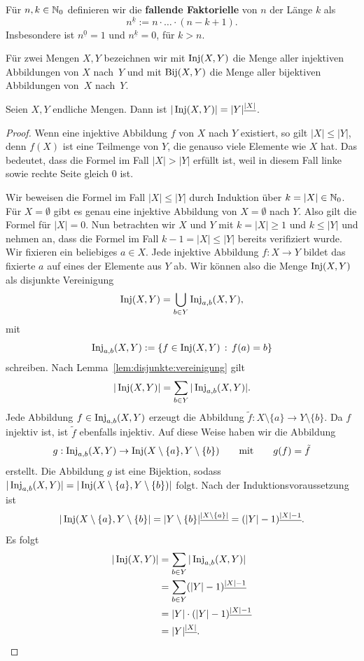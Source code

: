 \begin{defn}
	Für $n, k \in \mathbb{N}_0$ definieren wir die \textbf{fallende Faktorielle} von $n$ der Länge $k$ als
	\[
		n^{\underline{k}} := n \cdot \ldots \cdot (n-k+1).
	\]
	Insbesondere ist $n^{\underline{0}}=1$ und $n^{\underline{k}}=0$, für $k > n$.
\end{defn} 

\begin{defn}
	Für zwei Mengen $X, Y$ bezeichnen wir mit $\operatorname{Inj}(X,Y)$ die Menge aller injektiven Abbildungen von $X$ nach~$Y$ und mit $\operatorname{Bij}(X,Y)$ die Menge aller bijektiven Abbildungen von~$X$ nach~$Y$. 
\end{defn} 

\begin{thm} \label{thm:inj:abbildungen}
	Seien $X,Y$ endliche Mengen. Dann ist $|\operatorname{Inj}(X,Y) | = |Y|^{\underline{|X|}}$. 
\end{thm} 
\begin{proof} 
	Wenn eine injektive Abbildung $f$ von $X$ nach $Y$ existiert, so gilt $|X| \le |Y|$, denn $f(X)$ ist eine Teilmenge von $Y$, die genauso viele Elemente wie $X$ hat. Das bedeutet, dass die Formel im Fall $|X| > |Y|$ erfüllt ist, weil in diesem Fall linke sowie rechte Seite gleich $0$ ist.
	
	Wir beweisen die Formel im Fall $|X| \le |Y|$ durch Induktion über $k = |X| \in \mathbb{N}_0$. Für $X = \emptyset$ gibt es genau eine injektive Abbildung von $X= \emptyset$ nach $Y$. Also gilt die Formel für $|X|=0$. 
	Nun betrachten wir $X$ und $Y$ mit $k=|X| \geq 1$ und $k \le |Y|$ und nehmen an, dass die Formel im Fall $k-1=|X| \le |Y|$ bereits verifiziert wurde. Wir fixieren ein beliebiges $a \in X$. Jede injektive Abbildung $f : X \to Y$ bildet das fixierte $a$ auf eines der Elemente aus $Y$ ab. Wir können also die Menge $\operatorname{Inj}(X,Y)$ als disjunkte Vereinigung 
	\[
			\operatorname{Inj}(X,Y) = \bigcup_{b \in Y} \operatorname{Inj}_{a,b}(X,Y),
	\]
	mit 
	\[
		\operatorname{Inj}_{a,b} (X,Y) := \left\{  f \in \operatorname{Inj}(X,Y) \,:\, f(a) = b \right\}
	\]
	schreiben. Nach Lemma~\ref{lem:disjunkte:vereinigung} gilt 
	\[
			|\operatorname{Inj}(X,Y)| = \sum_{b \in Y} |\operatorname{Inj}_{a,b}(X,Y)|.
	\]
	Jede Abbildung $f  \in \operatorname{Inj}_{a,b}(X,Y)$ erzeugt die Abbildung $\tilde{f} : X \setminus \{a\} \to Y \setminus \{b\}$. Da $f$ injektiv ist, ist $\tilde{f}$ ebenfalls injektiv. Auf diese Weise haben wir die Abbildung 
	\[
	g : \operatorname{Inj}_{a,b}(X,Y) \to \operatorname{Inj}(X \setminus \{a\}, Y \setminus \{b\}) \qquad \textrm{mit} \qquad  g(f) = \tilde{f} 
	\]
    erstellt. Die Abbildung $g$ ist eine Bijektion, sodass $|\operatorname{Inj}_{a,b}(X,Y)| = |\operatorname{Inj}(X \setminus \{a\},Y \setminus \{b\})|$ folgt. Nach der Induktionsvoraussetzung ist 
	\[
		|\operatorname{Inj}(X \setminus \{a\}, Y \setminus \{b\} | = |Y \setminus \{b\}|^{\underline{|X \setminus \{a\}|}} = (|Y| -1)^{\underline{|X|-1}}.
	\] 
	Es folgt 
	\begin{align*}
	|\operatorname{Inj}(X,Y)| & = \sum_{b \in Y} |\operatorname{Inj}_{a,b}(X,Y)| 
		\\ & = \sum_{b \in Y} (|Y| -1)^{\underline{|X|-1}} 
		\\ & = |Y| \cdot (|Y| -1)^{\underline{|X|-1}}
		\\ & = |Y|^{\underline{|X|}}. 
	\end{align*}
\end{proof} 

